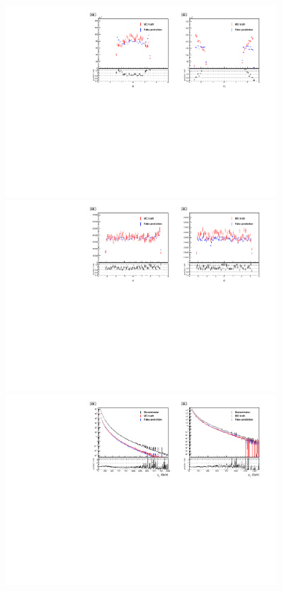\begin{figure}[!htbp]
\centering
\includegraphics[width=0.9\textwidth]{fig/closure_test_photon_kinematics_eta_2017sans_Denom.pdf}\\
\includegraphics[width=0.9\textwidth]{fig/closure_test_photon_kinematics_phi_2017sans_Denom.pdf}\\
\includegraphics[width=0.9\textwidth]{fig/closure_test_photon_kinematics_pt_2017.pdf}

\end{figure}
